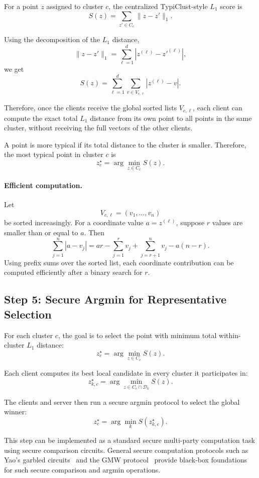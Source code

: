 \documentclass{article}
\begin{document}
For a point $z$ assigned to cluster $c$, the centralized TypiClust-style $L_1$ score is
\[
    S(z)
    =
    \sum_{z' \in C_c}
    \|z-z'\|_1.
\]

Using the decomposition of the $L_1$ distance,
\[
    \|z-z'\|_1
    =
    \sum_{\ell=1}^d
    |z^{(\ell)} - z'^{(\ell)}|,
\]
we get
\[
    S(z)
    =
    \sum_{\ell=1}^d
    \sum_{v \in V_{c,\ell}}
    |z^{(\ell)} - v|.
\]

Therefore, once the clients receive the global sorted lists $V_{c,\ell}$, each client can compute the exact total $L_1$ distance from its own point to all points in the same cluster, without receiving the full vectors of the other clients.

A point is more typical if its total distance to the cluster is smaller. Therefore, the most typical point in cluster $c$ is
\[
    z_c^\star
    =
    \arg\min_{z \in C_c} S(z).
\]

\paragraph{Efficient computation.}
Let
\[
    V_{c,\ell} = (v_1,\dots,v_n)
\]
be sorted increasingly. For a coordinate value $a=z^{(\ell)}$, suppose $r$ values are smaller than or equal to $a$. Then
\[
    \sum_{j=1}^n |a-v_j|
    =
    a r - \sum_{j=1}^r v_j
    +
    \sum_{j=r+1}^n v_j
    -
    a(n-r).
\]
Using prefix sums over the sorted list, each coordinate contribution can be computed efficiently after a binary search for $r$.

\subsection{Step 5: Secure Argmin for Representative Selection}

For each cluster $c$, the goal is to select the point with minimum total within-cluster $L_1$ distance:
\[
    z_c^\star
    =
    \arg\min_{z \in C_c} S(z).
\]

Each client computes its best local candidate in every cluster it participates in:
\[
    z_{k,c}^\star
    =
    \arg\min_{z \in C_c \cap \mathcal{D}_k} S(z).
\]

The clients and server then run a secure argmin protocol to select the global winner:
\[
    z_c^\star
    =
    \arg\min_k S(z_{k,c}^\star).
\]

This step can be implemented as a standard secure multi-party computation task using secure comparison circuits. General secure computation protocols such as Yao's garbled circuits~\cite{yao1982protocols} and the GMW protocol~\cite{goldreich1987play} provide black-box foundations for such secure comparison and argmin operations.
\end{document}
